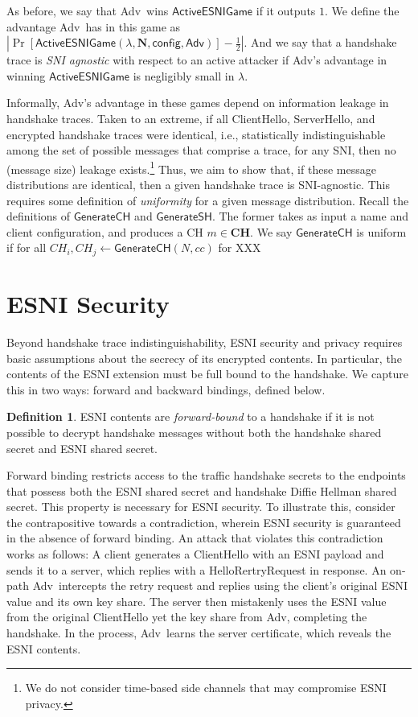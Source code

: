 \documentclass{article}
\newcommand{\adv}{{\sf Adv}}
\newcommand{\madv}{\mathsf{Adv}}
\theoremstyle{definition}
\newtheorem{definition}{Definition}[section]
\begin{document}
As before, we say that \adv\ wins $\mathsf{ActiveESNIGame}$ if it outputs $1$. 
We define the advantage \adv\ has in this game as
$|\Pr[\mathsf{ActiveESNIGame}(\lambda, \mathbf{N}, \mathsf{config}, \madv)] - \frac{1}{2}|$. 
And we say that a handshake trace is \emph{SNI agnostic} with respect to an active attacker 
if \adv's advantage in winning $\mathsf{ActiveESNIGame}$ is negligibly small in $\lambda$.

Informally, \adv's advantage in these games depend on information leakage in handshake traces. 
Taken to an extreme, if all ClientHello, ServerHello, and encrypted handshake traces were 
identical, i.e., statistically indistinguishable among the set of possible messages that comprise
a trace, for any SNI, then no (message size) leakage exists.\footnote{We do not consider time-based
side channels that may compromise ESNI privacy.} Thus, we aim to show that, if these message
distributions are identical, then a given handshake trace is SNI-agnostic. This requires some
definition of \emph{uniformity} for a given message distribution. Recall the definitions of 
$\mathsf{GenerateCH}$ and $\mathsf{GenerateSH}$. The former takes as input a name and client
configuration, and produces a CH $m \in \mathbf{CH}$. We say $\mathsf{GenerateCH}$ is uniform
if for all $CH_i, CH_j \gets \mathsf{GenerateCH}(N, cc)$ for XXX

\section{ESNI Security}

Beyond handshake trace indistinguishability, ESNI security and privacy requires basic assumptions
about the secrecy of its encrypted contents. In particular, the contents of the ESNI extension must
be full bound to the handshake. We capture this in two ways: forward and backward bindings, defined 
below.

\begin{definition}
ESNI contents are \emph{forward-bound} to a handshake if it is not possible to decrypt handshake messages 
without both the handshake shared secret and ESNI shared secret.
\end{definition}

Forward binding restricts access to the traffic handshake secrets to the endpoints that possess both
the ESNI shared secret and handshake Diffie Hellman shared secret. This property is necessary for 
ESNI security. To illustrate this, consider the contrapositive towards a contradiction, wherein ESNI 
security is guaranteed in the absence of forward binding. An attack that violates this contradiction works 
as follows: A client generates a ClientHello with an ESNI payload and sends it to a server, which replies 
with a HelloRertryRequest in response. An on-path \adv\ intercepts the retry request and replies using
the client's original ESNI value and its own key share. The server then mistakenly uses the ESNI
value from the original ClientHello yet the key share from \adv, completing the handshake. In the
process, \adv\ learns the server certificate, which reveals the ESNI contents.
\end{document}

